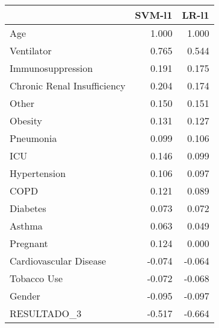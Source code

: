 \begin{tabular}{lrr}
\toprule
{} &  SVM-l1 &  LR-l1 \\
\midrule
Age                         &   1.000 &  1.000 \\
Ventilator                  &   0.765 &  0.544 \\
Immunosuppression           &   0.191 &  0.175 \\
Chronic Renal Insufficiency &   0.204 &  0.174 \\
Other                       &   0.150 &  0.151 \\
Obesity                     &   0.131 &  0.127 \\
Pneumonia                   &   0.099 &  0.106 \\
ICU                         &   0.146 &  0.099 \\
Hypertension                &   0.106 &  0.097 \\
COPD                        &   0.121 &  0.089 \\
Diabetes                    &   0.073 &  0.072 \\
Asthma                      &   0.063 &  0.049 \\
Pregnant                    &   0.124 &  0.000 \\
Cardiovascular Disease      &  -0.074 & -0.064 \\
Tobacco Use                 &  -0.072 & -0.068 \\
Gender                      &  -0.095 & -0.097 \\
RESULTADO\_3                 &  -0.517 & -0.664 \\
\bottomrule
\end{tabular}
